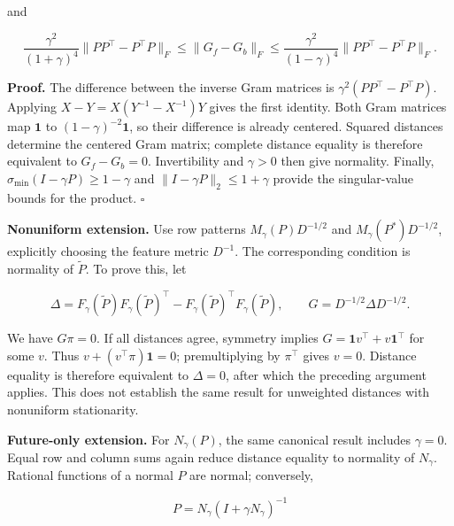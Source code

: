 \documentclass[11pt,a4paper]{article}
\begin{document}
\par
\noindent\begin{minipage}{\linewidth}

and

\[
\frac{\gamma^2}{(1+\gamma)^4}\|PP^\top-P^\top P\|_F
\le\|G_f-G_b\|_F
\le\frac{\gamma^2}{(1-\gamma)^4}\|PP^\top-P^\top P\|_F.
\]

\end{minipage}\par

\textbf{Proof.} The difference between the inverse Gram matrices is
\(\gamma^2(PP^\top-P^\top P)\). Applying \(X-Y=X(Y^{-1}-X^{-1})Y\) gives
the first identity. Both Gram matrices map \(\mathbf1\) to
\((1-\gamma)^{-2}\mathbf1\), so their difference is already centered.
Squared distances determine the centered Gram matrix; complete distance
equality is therefore equivalent to \(G_f-G_b=0\). Invertibility and
\(\gamma>0\) then give normality. Finally,
\(\sigma_{\min}(I-\gamma P)\ge1-\gamma\) and
\(\|I-\gamma P\|_2\le1+\gamma\) provide the singular-value bounds for
the product. \(\square\)

\par
\noindent\begin{minipage}{\linewidth}

\textbf{Nonuniform extension.} Use row patterns \(M_\gamma(P)D^{-1/2}\)
and \(M_\gamma(P^*)D^{-1/2}\), explicitly choosing the feature metric
\(D^{-1}\). The corresponding condition is normality of
\(\widetilde P\). To prove this, let

\[
\Delta=F_\gamma(\widetilde P)F_\gamma(\widetilde P)^\top
-F_\gamma(\widetilde P)^\top F_\gamma(\widetilde P),
\qquad G=D^{-1/2}\Delta D^{-1/2}.
\]

\end{minipage}\par

We have \(G\pi=0\). If all distances agree, symmetry implies
\(G=\mathbf1v^\top+v\mathbf1^\top\) for some \(v\). Thus
\(v+(v^\top\pi)\mathbf1=0\); premultiplying by \(\pi^\top\) gives
\(v=0\). Distance equality is therefore equivalent to \(\Delta=0\),
after which the preceding argument applies. This does not establish the
same result for unweighted distances with nonuniform stationarity.

\par
\noindent\begin{minipage}{\linewidth}

\textbf{Future-only extension.} For \(N_\gamma(P)\), the same canonical
result includes \(\gamma=0\). Equal row and column sums again reduce
distance equality to normality of \(N_\gamma\). Rational functions of a
normal \(P\) are normal; conversely,

\[
P=N_\gamma(I+\gamma N_\gamma)^{-1}
\]

\end{minipage}\par
\end{document}
